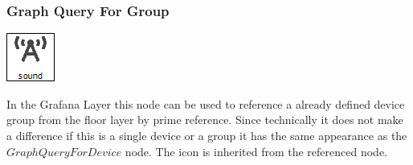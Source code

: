 \subsubsection{Graph Query For Group}
\noindent\begin{minipage}{0.15\textwidth}%
\includegraphics[width=\linewidth]{assets/images/group2}
\end{minipage}%
\hfill%
\begin{minipage}{0.8\textwidth}
In the Grafana Layer this node can be used to reference a already defined device group from the floor layer by prime reference. Since technically it does not make a difference if this is a single device or a group it has the same appearance as the $GraphQueryForDevice$ node. The icon is inherited from the referenced node.
\end{minipage}


